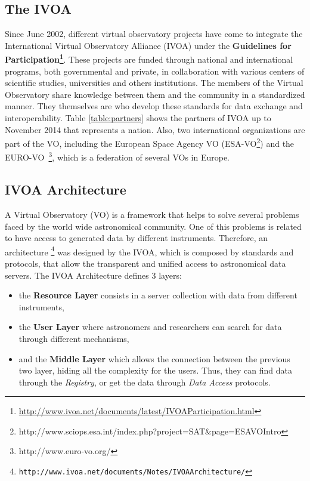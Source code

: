 \normalsize

\subsection{The IVOA}

Since June 2002, different virtual observatory projects have come to integrate the
International Virtual Observatory Alliance (IVOA) under the \textbf{Guidelines
for
Participation\footnote{\url{http://www.ivoa.net/documents/latest/IVOAParticipation.html}}}. 
These projects are funded through national and international programs, both governmental and 
private, in collaboration with various centers of scientific studies, universities and
others institutions. The members of the Virtual Observatory share
knowledge between them and the community in a standardized manner. They
themselves are who develop these standards for data exchange and
interoperability.
Table \ref{table:partners} shows the partners of IVOA up to
November 2014 that represents a nation. Also, two international organizations
are part of the VO, including the European Space Agency VO
(ESA-VO\footnote{http://www.sciops.esa.int/index.php?project=SAT\&page=ESAVOIntro})
and the EURO-VO~\footnote{http://www.euro-vo.org/}, which is a federation of several VOs in Europe.

\subsection{IVOA Architecture}

A Virtual Observatory (VO) is a framework that helps to solve several
problems faced by the world wide astronomical community.
One of this problems is related to have access to generated data by
different instruments. Therefore, an architecture
\footnote{\texttt{http://www.ivoa.net/documents/Notes/IVOAArchitecture/}} was designed by the IVOA, which is composed by
standards and protocols, that allow the transparent
and unified access to astronomical data servers. The IVOA Architecture
defines 3 layers:
\begin{itemize}
        \item the \textbf{Resource Layer} consists in a server
collection with data from different instruments,
        \item the \textbf{User Layer} where astronomers and researchers can
search for data through different mechanisms,
        \item and the \textbf{Middle Layer} which allows the connection
between the previous two layer, hiding all the complexity for the
users. Thus, they can find data through the \emph{Registry}, or get the data
through \emph{Data Access} protocols.
\end{itemize}

